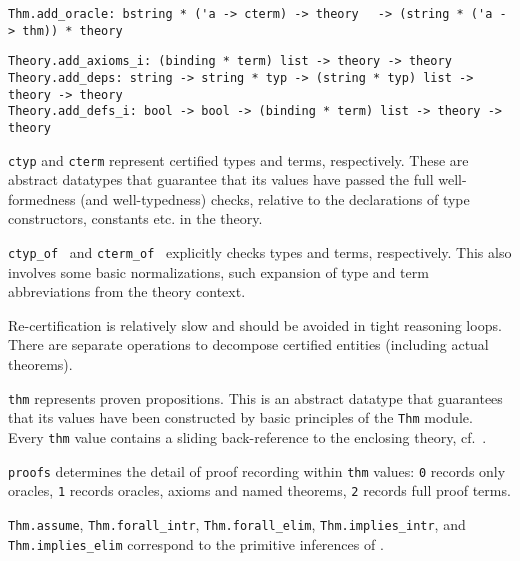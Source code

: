 \begin{isabellebody}
\begin{isamarkuptext}
\begin{mldecls}
  \verb|Thm.add_oracle: bstring * ('a -> cterm) -> theory|\isasep\isanewline%
\verb|  -> (string * ('a -> thm)) * theory| \\
  \end{mldecls}
  \begin{mldecls}
  \verb|Theory.add_axioms_i: (binding * term) list -> theory -> theory| \\
  \verb|Theory.add_deps: string -> string * typ -> (string * typ) list -> theory -> theory| \\
  \verb|Theory.add_defs_i: bool -> bool -> (binding * term) list -> theory -> theory| \\
  \end{mldecls}

  \begin{description}

  \item \verb|ctyp| and \verb|cterm| represent certified types
  and terms, respectively.  These are abstract datatypes that
  guarantee that its values have passed the full well-formedness (and
  well-typedness) checks, relative to the declarations of type
  constructors, constants etc. in the theory.

  \item \verb|ctyp_of|~ and \verb|cterm_of|~ explicitly checks types and terms, respectively.  This also
  involves some basic normalizations, such expansion of type and term
  abbreviations from the theory context.

  Re-certification is relatively slow and should be avoided in tight
  reasoning loops.  There are separate operations to decompose
  certified entities (including actual theorems).

  \item \verb|thm| represents proven propositions.  This is an
  abstract datatype that guarantees that its values have been
  constructed by basic principles of the \verb|Thm| module.
  Every \verb|thm| value contains a sliding back-reference to the
  enclosing theory, cf.\ .

  \item \verb|proofs| determines the detail of proof recording within
  \verb|thm| values: \verb|0| records only oracles, \verb|1| records
  oracles, axioms and named theorems, \verb|2| records full proof
  terms.

  \item \verb|Thm.assume|, \verb|Thm.forall_intr|, \verb|Thm.forall_elim|, \verb|Thm.implies_intr|, and \verb|Thm.implies_elim|
  correspond to the primitive inferences of .


\end{description}
\end{isamarkuptext}
\end{isabellebody}
